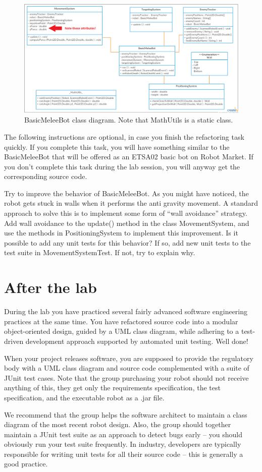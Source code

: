 \documentclass{scrreprt}
\begin{document}
\begin{figure}
\centering
\includegraphics[width=1.1\textwidth]{figures/BasicMeleeBotClassDiagram.png}
\caption{BasicMeleeBot class diagram. Note that MathUtils is a static class.}
\label{fig:classDiagram}
\end{figure}

\newpage

The following instructions are optional, in case you finish the refactoring task quickly. If you complete this task, you will have something similar to the BasicMeleeBot that will be offered as an ETSA02 basic bot on Robot Market. If you don't complete this task during the lab session, you will anyway get the corresponding source code.

Try to improve the behavior of BasicMeleeBot. As you might have noticed, the robot gets stuck in walls when it performs the anti gravity movement. A standard approach to solve this is to implement some form of ``wall avoidance'' strategy. Add wall avoidance to the update() method in the class MovementSystem, and use the methods in PositioningSystem to implement this improvement. Is it possible to add any unit tests for this behavior? If so, add new unit tests to the test suite in MovementSystemTest. If not, try to explain why.

\chapter{After the lab}
During the lab you have practiced several fairly advanced software engineering practices at the same time. You have refactored source code into a modular object-oriented design, guided by a UML class diagram, while adhering to a test-driven development approach supported by automated unit testing. Well done!

When your project releases software, you are supposed to provide the regulatory body with a UML class diagram and source code complemented with a suite of JUnit test cases. Note that the group purchasing your robot should not receive anything of this, they get only the requirements specification, the test specification, and the executable robot as a .jar file.

We recommend that the group helps the software architect to maintain a class diagram of the most recent robot design. Also, the group should together maintain a JUnit test suite as an approach to detect bugs early -- you should obviously run your test suite frequently. In industry, developers are typically responsible for writing unit tests for all their source code -- this is generally a good practice.
\end{document}
